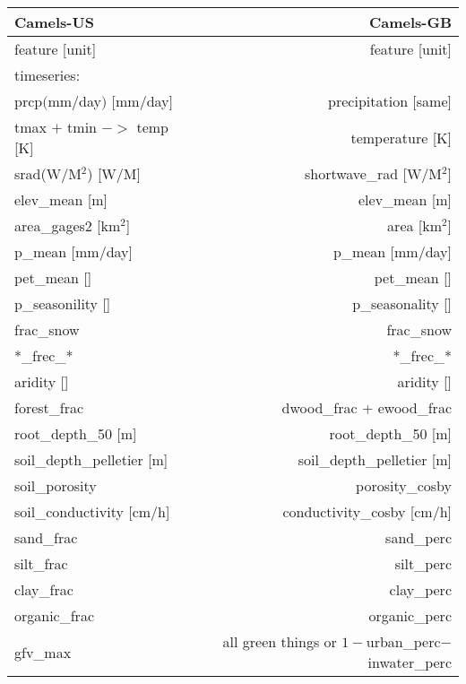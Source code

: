 \begin{tabular}{lr}
\toprule
Camels-US &     Camels-GB \\
\midrule
feature [unit]    & feature [unit] \\
timeseries: & \\
prcp$($mm$/$day$)$ $[$mm$/$day$]$ & precipitation [same] \\
tmax $+$ tmin $->$ temp [K] & temperature [K]\\
srad(W$/$M$^2$) [W$/$M] & shortwave\_rad [W$/$M$^2$] \\
elev\_mean [m]  & elev\_mean [m] \\
area\_gages2 [km$^2$] & area [km$^2$] \\
p\_mean [mm/day] & p\_mean [mm/day] \\
pet\_mean [] & pet\_mean [] \\
p\_seasonility [] & p\_seasonality [] \\
frac\_snow & frac\_snow \\
*\_frec\_* & *\_frec\_* \\
aridity [] & aridity [] \\
forest\_frac & dwood\_frac + ewood\_frac \\ 
root\_depth\_50 [m] & root\_depth\_50 [m] \\
soil\_depth\_pelletier [m] & soil\_depth\_pelletier [m] \\
soil\_porosity & porosity\_cosby \\
soil\_conductivity [cm/h] & conductivity\_cosby [cm/h] \\
sand\_frac & sand\_perc \\
silt\_frac & silt\_perc \\ 
clay\_frac & clay\_perc \\ 
organic\_frac & organic\_perc \\
gfv\_max & all green things  or $1 -$urban\_perc$-$inwater\_perc  \\
\bottomrule
\end{tabular}

